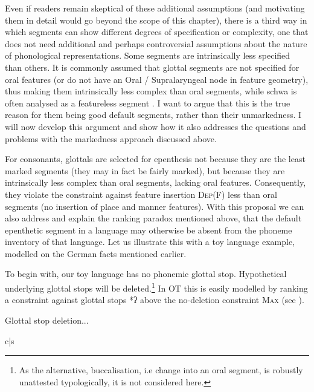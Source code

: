 \documentclass[output=paper,colorlinks,citecolor=brown]{langscibook}
\begin{document}
Even if readers remain skeptical of these additional assumptions (and motivating them in detail would go beyond the scope of this chapter), there is a third way in which segments can show different degrees of specification or complexity, one that does not need additional and perhaps controversial assumptions about the nature of phonological representations. Some segments are intrinsically less specified than others. It is commonly assumed that glottal segments are not specified for oral features (or do not have an Oral / Supralaryngeal node in feature geometry), thus making them intrinsically less complex than oral segments, while schwa is often analysed as a featureless segment \citep[e.g.][]{oostendorp00, crosswhite04}. I want to argue that this is the true reason for them being good default segments, rather than their unmarkedness. I will now develop this argument and show how it also addresses the questions and problems with the markedness approach discussed above.

For consonants, glottals are selected for epenthesis not because they are the least marked segments (they may in fact be fairly marked), but because they are intrinsically less complex than oral segments, lacking oral features. Consequently, they violate the constraint against feature insertion \textsc{Dep(F)} less than oral segments (no insertion of place and manner features). With this proposal we can also address and explain the ranking paradox mentioned above, that the default epenthetic segment in a language may otherwise be absent from the phoneme inventory of that language. Let us illustrate this with a toy language example, modelled on the German facts mentioned earlier.

To begin with, our toy language has no phonemic glottal stop. Hypothetical underlying glottal stops will be deleted.\footnote{As the alternative, buccalisation, i.e change into an oral segment, is robustly unattested typologically, it is not considered here.} In OT this is easily modelled by ranking a constraint against glottal stops *ʔ above the no-deletion constraint \textsc{Max} (see ).


\begin{table}
\caption{Glottal stop deletion...}
\label{tab:1:tbl1}
\ShadingOn
\begin{tableau}{c|s} 
        
\cand{[aʔ]}        \vio{*!}  \vio{} 
\cand[\Optimal]{[a]}        \vio{}   \vio{*}  
\end{tableau}
\end{table}
\end{document}
